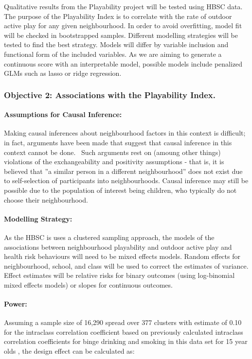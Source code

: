 \documentclass [11pt]{article}
\begin{document}
Qualitative results from the Playability project will be tested using HBSC data. The purpose of the Playability Index is to correlate with the rate of outdoor active play for any given neighbourhood. In order to avoid overfitting, model fit will be checked in bootstrapped samples. Different modelling strategies will be tested to find the best strategy. Models will differ by variable inclusion and functional form of the included variables.  As we are aiming to generate a continuous score with an interpretable model, possible models include penalized GLMs such as lasso or ridge regression.   

\subsubsection{Objective 2: Associations with the Playability Index.}

\paragraph{Assumptions for Causal Inference:} Making causal inferences about neighbourhood factors in this context is difficult; in fact, arguments have been made that suggest that causal inference in this context cannot be done.~\cite{Oakes2004-jw} Such arguments rest on (amoung other things) violations of the exchangeability and positivity assumptions - that is, it is believed that ''a similar person in a different neighbourhood'' does not exist due to self-selection of participants into neighbourhoods. Causal inference may still be possible due to the population of interest being children, who typically do not choose their neighbourhood.

\paragraph{Modelling Strategy:} As the HBSC is uses a clustered sampling approach, the models of the associations between neighbourhood playability and outdoor active play and health risk behaviours will need to be mixed effects models. Random effects for neighbourhood, school, and class will be used to correct the estimates of variance. Effect estimates will be relative risks for binary outcomes (using log-binomial mixed effects models) or slopes for continuous outcomes. 

\paragraph{Power:} Assuming a sample size of 16,290 spread over 377 clusters with estimate of 0.10 for the intraclass correlation coefficient based on previously calculated intraclass correlation coefficients for binge drinking and smoking in this data set for 15 year olds \cite{BOYES2017663}, the design effect can be calculated as:
\end{document}

